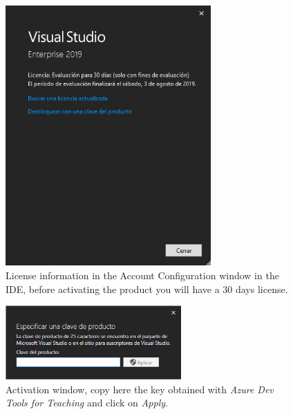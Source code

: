\begin{figure}
    \centering
    \includegraphics[width= 0.7\textwidth]{Figures/Instalacion5}
    \caption{License information in the Account Configuration window in the IDE, before activating the product you will have a 30 days license.}
    \label{fig:Instalacion5}
\end{figure}

\begin{figure}
    \centering
    \includegraphics[width= 0.6\textwidth]{Figures/Instalacion6}
    \caption{Activation window, copy here the key obtained with \textit{Azure Dev Tools for Teaching} and click on \textit{Apply}.}
    \label{fig:Instalacion6}
\end{figure}



